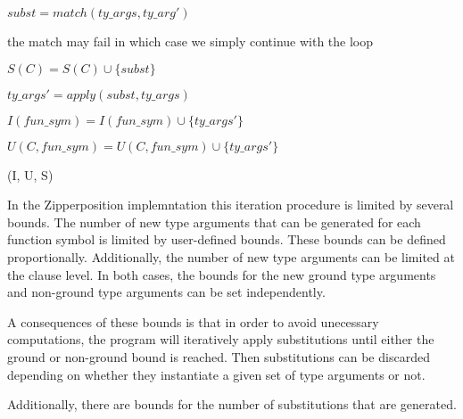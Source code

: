 \documentclass[]{ceurart}
\begin{document}
\begin{algorithm}[tbh]
\begin{algorithmic}[1]
            
            \State \(subst = match(ty\_args, ty\_arg')\)

            \State \Comment the match may fail in which case we simply continue with the loop

            \State \(S(C) = S(C) \cup \{subst\}\)
         \EndFor
      \EndFor
   
   \EndFor

            \State \(ty\_args' = apply(subst, ty\_args)\)


               \State \(I(fun\_sym) = I(fun\_sym) \cup \{ty\_args'\}\)
            \Else

               \State \(U(C, fun\_sym) = U(C, fun\_sym) \cup \{ty\_args'\}\)
            \EndIf

         \EndFor
      \EndFor
   \EndFor

   \State \Return (I, U, S)

\EndFunction
\end{algorithmic}
\end{algorithm}
In the Zipperposition implemntation this iteration procedure is limited by several bounds. The number of new type arguments that can be generated for each function symbol is limited by user-defined bounds. These bounds can be defined proportionally. Additionally, the number of new type arguments can be limited at the clause level. In both cases, the bounds for the new ground type arguments and non-ground type arguments can be set independently.

A consequences of these bounds is that in order to avoid unecessary computations, the program will iteratively apply substitutions until either the ground or non-ground bound is reached. Then substitutions can be discarded depending on whether they instantiate a given set of type arguments or not.

Additionally, there are bounds for the number of substitutions that are generated.
\end{document}
